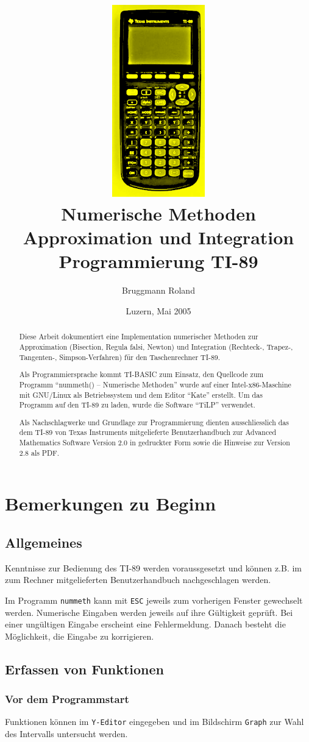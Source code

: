\documentclass[a5paper,9pt]{scrreprt}
\author{Bruggmann Roland}
\title{
\includegraphics[width=0.3\textwidth]{img/TI-89_pocket_calculator.png}
\bigskip
\\Numerische Methoden
\\Approximation und Integration
\\Programmierung TI-89}
\date{Luzern, Mai 2005}
\begin{document}
\maketitle[-1] %

\begin{abstract}
Diese Arbeit dokumentiert eine Implementation numerischer Methoden zur Approximation (Bisection, Regula falsi, Newton) und Integration (Rechteck-, Trapez-, Tangenten-, Simpson-Verfahren) f\"ur den Taschenrechner TI-89.

Als Programmiersprache kommt TI-BASIC zum Einsatz, den Quellcode zum Programm \enquote{nummeth() -- Numerische Methoden}  wurde auf einer Intel-x86-Maschine mit GNU/Linux als Betriebssystem und dem Editor \enquote{Kate} erstellt. Um das Programm auf den TI-89 zu laden, wurde die Software \enquote{TiLP} verwendet.

Als Nachschlagwerke und Grundlage zur Programmierung dienten ausschliesslich das dem TI-89 von Texas Instruments mitgelieferte Benutzerhandbuch zur Advanced Mathematics Software Version 2.0 \cite{AVM99} in gedruckter Form sowie die Hinweise zur Version 2.8 \cite{AVM02} als PDF.
\end{abstract}

\setcounter{secnumdepth}{2}
\tableofcontents

\chapter{Bemerkungen zu Beginn}
\section{Allgemeines}
Kenntnisse zur Bedienung des TI-89 werden voraussgesetzt und k\"onnen z.B. im zum Rechner mitgelieferten Benutzerhandbuch \cite{AVM99} nachgeschlagen werden.

Im Programm \verb|nummeth| kann mit \verb|ESC| jeweils zum vorherigen Fenster gewechselt werden. Numerische Eingaben werden jeweils auf ihre G\"ultigkeit gepr\"uft. Bei einer ung\"ultigen Eingabe erscheint eine Fehlermeldung. Danach besteht die M\"oglichkeit, die Eingabe zu korrigieren.

\section{Erfassen von Funktionen}
\subsection*{Vor dem Programmstart}
Funktionen k\"onnen im \verb|Y-Editor| eingegeben und im Bildschirm \verb|Graph| zur Wahl des Intervalls untersucht werden.
\end{document}
